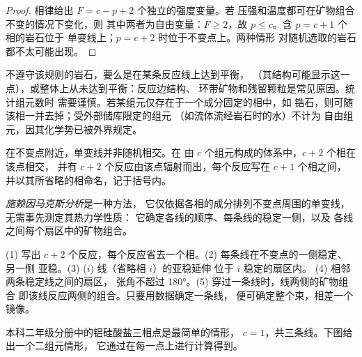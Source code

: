 \begin{proof}
相律给出 $F = c - p + 2$ 个独立的强度变量。若
压强和温度都可在矿物组合不变的情况下变化，则
其中两者为自由变量：$F \ge 2$，故 $p \le c$。含 $p = c + 1$ 个相的岩石位于
单变线上；$p = c + 2$ 时位于不变点上。两种情形
对随机选取的岩石都不太可能出现。
\end{proof}

不遵守该规则的岩石，要么是在某条反应线上达到平衡，
（其结构可能显示这一点），或整体上从未达到平衡：反应边结构、
环带矿物和残留颗粒是常见原因。统计组元数时
需要谨慎。若某组元仅存在于一个成分固定的相中，如
锆石，则可随该相一并去掉；受外部储库限定的组元
（如流体流经岩石时的水）不计为
自由组元，因其化学势已被外界规定。

在不变点附近，单变线并非随机相交。在
由 $c$ 个组元构成的体系中，$c + 2$ 个相在该点相交，
并有 $c + 2$ 个反应由该点辐射而出，每个反应写在 $c + 1$ 个相之间，
并以其所省略的相命名，记于括号内。

\begin{definition}[施赖因马克斯分析]\label{def:b3:petrological-thermodynamics:schreinemakers}
\emph{施赖因马克斯分析}是一种方法，
它仅依据各相的成分排列不变点周围的单变线，
无需事先测定其热力学性质：
它确定各线的顺序、每条线的稳定一侧，以及
各线之间每个扇区中的矿物组合。
\end{definition}

\begin{method}[施赖因马克斯规则]\label{met:b3:petrological-thermodynamics:schreinemakers}
(1) 写出 $c + 2$ 个反应，每个反应省去一个相。(2) 每条线在不变点的一侧稳定、另一侧
亚稳。(3) ($i$) 线（省略相 $i$）的亚稳延伸
位于 $i$ 稳定的扇区内。
(4) 相邻两条稳定线之间的扇区，
张角不超过 \ang{180}。(5) 穿过一条线时，线两侧的矿物组合
即该线反应两侧的组合。只要用数据确定一条线，
便可确定整个束，相差一个镜像。
\end{method}

本科二年级分册中的铝硅酸盐三相点是最简单的情形，
$c = 1$，共三条线。下图给出一个二组元情形，
它通过在每一点上进行计算得到。

